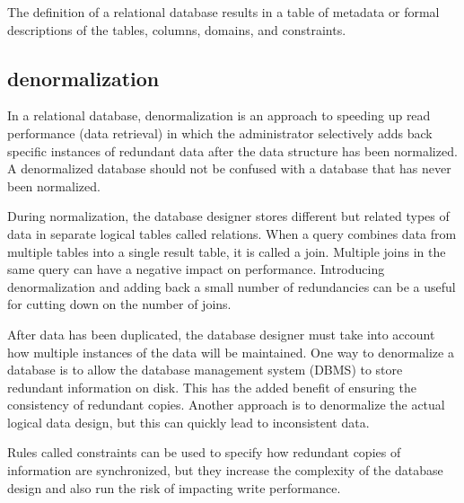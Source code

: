 The definition of a relational database results in a table of metadata or formal descriptions of the tables, columns, domains, and constraints.


\subsection{denormalization}

In a relational database, denormalization is an approach to speeding up read performance (data retrieval) in which the administrator selectively adds back specific instances of redundant data after the data structure has been normalized. A denormalized database should not be confused with a database that has never been normalized.

During normalization, the database designer stores different but related types of data in separate logical tables called relations. When a query combines data from multiple tables into a single result table, it is called a join. Multiple joins in the same query can have a negative impact on performance. Introducing denormalization and adding back a small number of redundancies can be a useful for cutting down on the number of joins.

After data has been duplicated, the database designer must take into account how multiple instances of the data will be maintained. One way to denormalize a database is to allow the database management system (DBMS) to store redundant information on disk. This has the added benefit of ensuring the consistency of redundant copies. Another approach is to denormalize the actual logical data design, but this can quickly lead to inconsistent data. 

Rules called constraints can be used to specify how redundant copies of information are synchronized, but they increase the complexity of the database design and also run the risk of impacting write performance.


